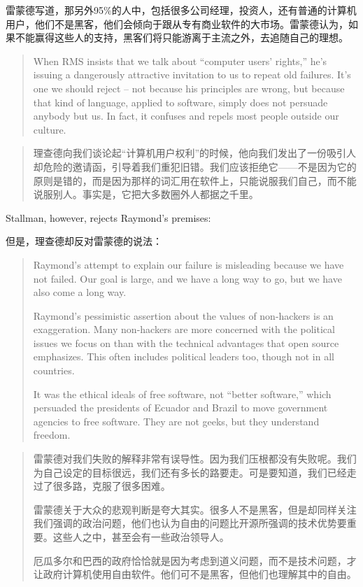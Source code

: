 \ifdefined\chs
雷蒙德写道，那另外95\%的人中，包括很多公司经理，投资人，还有普通的计算机用户，他们不是黑客，他们会倾向于跟从专有商业软件的大市场。雷蒙德认为，如果不能赢得这些人的支持，黑客们将只能游离于主流之外，去追随自己的理想。
\fi

\ifdefined\eng
\begin{quote}
When RMS insists that we talk about ``computer users' rights,'' he's issuing a dangerously attractive invitation to us to repeat old failures. It's one we should reject -- not because his principles are wrong, but because that kind of language, applied to software, simply does not persuade anybody but us. In fact, it confuses and repels most people outside our culture.
\end{quote}
\fi

\ifdefined\chs
\begin{quote}
理查德向我们谈论起“计算机用户权利”的时候，他向我们发出了一份吸引人却危险的邀请函，引导着我们重犯旧错。我们应该拒绝它——不是因为它的原则是错的，而是因为那样的词汇用在软件上，只能说服我们自己，而不能说服别人。事实是，它把大多数圈外人都据之千里。
\end{quote}
\fi

\ifdefined\eng
Stallman, however, rejects Raymond's premises:
\fi

\ifdefined\chs
但是，理查德却反对雷蒙德的说法：
\fi

\ifdefined\eng
\begin{quote}
Raymond's attempt to explain our failure is misleading because we have not failed.  Our goal is large, and we have a long way to go, but we have also come a long way.

Raymond's pessimistic assertion about the values of non-hackers is an exaggeration.  Many non-hackers are more concerned with the political issues we focus on than with the technical advantages that open source emphasizes.  This often includes political leaders too, though not in all countries.

It was the ethical ideals of free software, not ``better software,'' which persuaded the presidents of Ecuador and Brazil to move government agencies to free software.  They are not geeks, but they understand freedom.
\end{quote}
\fi

\ifdefined\chs
\begin{quote}
雷蒙德对我们失败的解释非常有误导性。因为我们压根都没有失败呢。我们为自己设定的目标很远，我们还有多长的路要走。可是要知道，我们已经走过了很多路，克服了很多困难。

雷蒙德关于大众的悲观判断是夸大其实。很多人不是黑客，但是却同样关注我们强调的政治问题，他们也认为自由的问题比开源所强调的技术优势要重要。这些人之中，甚至会有一些政治领导人。

厄瓜多尔和巴西的政府恰恰就是因为考虑到道义问题，而不是技术问题，才让政府计算机使用自由软件。他们可不是黑客，但他们也理解其中的自由。

\end{quote}
\fi

